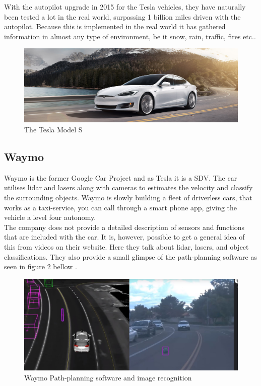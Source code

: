 With the autopilot upgrade in 2015 for the Tesla vehicles, they have naturally been tested a lot in the real world, surpassing 1 billion miles driven with the autopilot. Because this is implemented in the real world it has gathered information in almost any type of environment, be it snow, rain, traffic, fires etc.\cite{Tesla2}\cite{Tesla3}.
\begin{figure}[H]
\centering
\includegraphics[width=\textwidth]{Figures/ConAnalysis/Market/TeslaMS.jpg}
\caption{The Tesla Model S}
\label{fig:TeslaMS}
\end{figure}


\subsection{Waymo}
Waymo is the former Google Car Project and as Tesla it is a SDV. The car utilises lidar and lasers along with cameras to estimates the velocity and classify the surrounding objects. Waymo is slowly building a fleet of driverless cars, that works as a taxi-service, you can call through a smart phone app, giving the vehicle a level four autonomy.\\ 
The company does not provide a detailed description of sensors and functions that are included with the car. It is, however, possible to get a general idea of this from videos on their website. Here they talk about lidar, lasers, and object classifications. They also provide a small glimpse of the path-planning software as seen in figure \ref{fig:Waymo_Path} bellow \cite{waymo}.
\begin{figure}[H]
\centering
\includegraphics[width=\textwidth]{Figures/ConAnalysis/Market/Waymo.JPG}
\caption{Waymo Path-planning software and image recognition}
\label{fig:Waymo_Path}
\end{figure}

